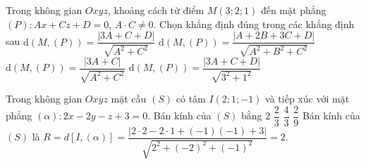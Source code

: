 \begin{ex}%
	Trong không gian $Oxyz$, khoảng cách từ điểm $M(3;2;1)$ đến mặt phẳng $(P)\colon Ax+Cz+D=0$, $A\cdot C\ne 0$. Chọn khẳng định đúng trong các khẳng định sau
	\choice
	{\True $\mathrm{d}(M,(P))=\dfrac{|3A+C+D|}{\sqrt{A^2+C^2}}$}
	{$\mathrm{d}(M,(P))=\dfrac{|A+2B+3C+D|}{\sqrt{A^2+B^2+C^2}}$}
	{$\mathrm{d}(M,(P))=\dfrac{|3A+C|}{\sqrt{A^2+C^2}}$}
	{$\mathrm{d}(M,(P))=\dfrac{|3A+C+D|}{\sqrt{3^2+1^2}}$}
\end{ex}
\begin{ex}%
	Trong không gian $Oxyz$ mặt cầu $(S)$ có tâm $I(2;1;-1)$ và tiếp xúc với mặt phẳng $(\alpha)\colon 2x-2y-z+3=0$. Bán kính của $(S)$ bằng
	\choice
	{\True $2$}
	{$\dfrac{2}{3}$}
	{$\dfrac{4}{3}$}
	{$\dfrac{2}{9}$}
	\loigiai
	{Bán kính của $(S)$ là $R=d[I,(\alpha)]=\dfrac{|2\cdot 2-2\cdot 1+(-1 )(-1 )+3|}{\sqrt{2^2+(-2)^2+(-1 )^2}}=2$.
	}
\end{ex}

